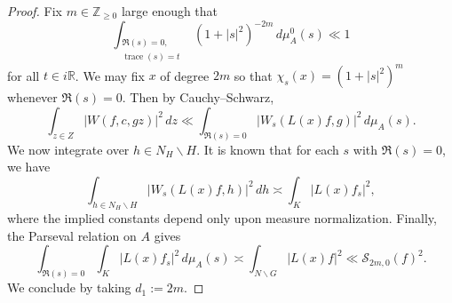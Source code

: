 \documentclass[reqno]{amsart}
\DeclareMathOperator{\trace}{trace}
\theoremstyle{plain} \newtheorem{theorem} {Theorem}
\theoremstyle{definition} \newtheorem{definition} [theorem] {Definition}
\theoremstyle{itplain} %
\numberwithin{equation}{section}
\numberwithin{theorem}{section}
\renewcommand{\geq}{\geqslant}
\begin{document}
\begin{proof}
Fix $m \in \mathbb{Z}_{\geq 0}$ large enough that
\begin{equation*}
  \int _{
    \substack{
      \Re(s) = 0,  \\
       \trace(s) = t
    }
  }
  (1 + |s|^2)^{-2 m} \, d \mu_A^0(s) \ll 1
\end{equation*}
for all $t \in i \mathbb{R}$.  We may fix $x$ of degree $2 m$ so that $\chi_s(x) = (1 + |s|^2)^m$ whenever $\Re(s) = 0$.  Then by Cauchy--Schwarz,
\begin{equation*}
  \int _{z \in Z}
  |W(f,c,g z)|^2 \, d z \ll
  \int _{\Re(s) = 0}
  \left\lvert W_s(L(x) f, g)  \right\rvert^2 \, d \mu_A(s).
\end{equation*}
We now integrate over $h \in N_H \backslash H$.  It is known \cite[Appendix A]{MR2930996} that for each $s$ with $\Re(s) = 0$, we have
\begin{equation}\label{eq:int-_g-in-norm}
  \int _{h \in N_H \backslash H} |W_s(L(x) f, h)|^2 \, d h
  \asymp
  \int _{K} |L(x) f_s|^2,
\end{equation}
where the implied constants depend only upon measure normalization.  Finally, the Parseval relation on $A$ gives
\begin{equation*}
  \int_{\Re(s) = 0} \int_K |L(x) f_s|^2 \, d \mu_A(s) \asymp \int _{N \backslash G} |L(x) f|^2
  \ll \mathcal{S}_{2 m,0}(f)^2.
\end{equation*}
We conclude by taking $d_1 := 2 m$.
\end{proof}
\end{document}

